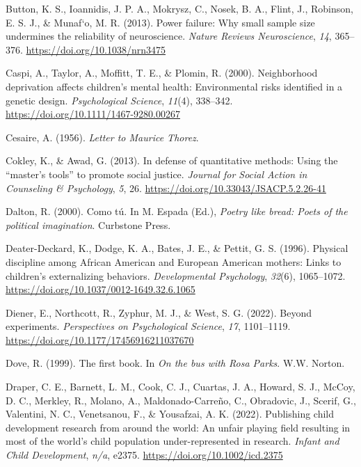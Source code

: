 \documentclass[
  letterpaper,
  DIV=11,
  numbers=noendperiod]{scrreprt}
\newlength{\cslhangindent}
\newenvironment{CSLReferences}[2] %
 {\begin{list}{}{%
  \setlength{\itemindent}{0pt}
  \setlength{\leftmargin}{0pt}
  \setlength{\parsep}{0pt}
  \ifodd #1
   \setlength{\leftmargin}{\cslhangindent}
   \setlength{\itemindent}{-1\cslhangindent}
  \fi
  \setlength{\itemsep}{#2\baselineskip}}}
 {\end{list}}
\begin{document}
\begin{CSLReferences}{1}{0}
Button, K. S., Ioannidis, J. P. A., Mokrysz, C., Nosek, B. A., Flint,
J., Robinson, E. S. J., \& Munaf`o, M. R. (2013). Power failure: Why
small sample size undermines the reliability of neuroscience.
\emph{Nature Reviews Neuroscience}, \emph{14}, 365--376.
\url{https://doi.org/10.1038/nrn3475}

Caspi, A., Taylor, A., Moffitt, T. E., \& Plomin, R. (2000).
Neighborhood deprivation affects children's mental health: Environmental
risks identified in a genetic design. \emph{Psychological Science},
\emph{11}(4), 338--342. \url{https://doi.org/10.1111/1467-9280.00267}

Cesaire, A. (1956). \emph{Letter to {M}aurice {T}horez}.

Cokley, K., \& Awad, G. (2013). In defense of quantitative methods:
Using the {``master's tools''} to promote social justice. \emph{Journal
for Social Action in Counseling \& Psychology}, \emph{5}, 26.
\url{https://doi.org/10.33043/JSACP.5.2.26-41}

Dalton, R. (2000). Como t{ú}. In M. Espada (Ed.), \emph{Poetry like
bread: Poets of the political imagination}. Curbstone Press.

Deater-Deckard, K., Dodge, K. A., Bates, J. E., \& Pettit, G. S. (1996).
{Physical discipline among African American and European American
mothers: Links to children's externalizing behaviors.}
\emph{Developmental Psychology}, \emph{32}(6), 1065--1072.
\url{https://doi.org/10.1037/0012-1649.32.6.1065}

Diener, E., Northcott, R., Zyphur, M. J., \& West, S. G. (2022). Beyond
experiments. \emph{Perspectives on Psychological Science}, \emph{17},
1101--1119. \url{https://doi.org/10.1177/17456916211037670}

Dove, R. (1999). The first book. In \emph{On the bus with {R}osa
{P}arks}. W.W. Norton.

Draper, C. E., Barnett, L. M., Cook, C. J., Cuartas, J. A., Howard, S.
J., McCoy, D. C., Merkley, R., Molano, A., Maldonado-Carreño, C.,
Obradovic, J., Scerif, G., Valentini, N. C., Venetsanou, F., \&
Yousafzai, A. K. (2022). Publishing child development research from
around the world: An unfair playing field resulting in most of the
world's child population under-represented in research. \emph{Infant and
Child Development}, \emph{n/a}, e2375.
\url{https://doi.org/10.1002/icd.2375}


\end{CSLReferences}
\end{document}
